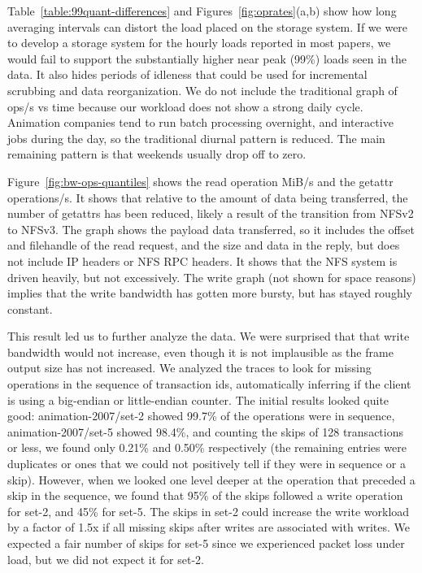 Table~\ref{table:99quant-differences} and
Figures~\ref{fig:oprates}(a,b) show how long averaging intervals can
distort the load placed on the storage system.  If we were to develop
a storage system for the hourly loads reported in most papers, we
would fail to support the substantially higher near peak (99\%) loads
seen in the data.  It also hides periods of idleness that could be
used for incremental scrubbing and data reorganization.  We do not
include the traditional graph of ops/s vs time because our workload
does not show a strong daily cycle.  Animation companies tend to run
batch processing overnight, and interactive jobs during the day, so
the traditional diurnal pattern is reduced.  The main remaining
pattern is that weekends usually drop off to zero.

Figure~\ref{fig:bw-ops-quantiles} shows the read operation MiB/s and
the getattr operations/s.  It shows that relative to the amount of
data being transferred, the number of getattrs has been reduced,
likely a result of the transition from NFSv2 to NFSv3.  The graph
shows the payload data transferred, so it includes the offset and
filehandle of the read request, and the size and data in the reply,
but does not include IP headers or NFS RPC headers.  It shows that the
NFS system is driven heavily, but not excessively. The write graph
(not shown for space reasons) implies that the write bandwidth has
gotten more bursty, but has stayed roughly constant.

This result led us to further analyze the data.  We were surprised
that that write bandwidth would not increase, even though it is not
implausible as the frame output size has not increased.  We analyzed
the traces to look for missing operations in the sequence of
transaction ids, automatically inferring if the client is using a
big-endian or little-endian counter.  The initial results looked quite
good: animation-2007/set-2 showed 99.7\% of the operations were in sequence,
animation-2007/set-5 showed 98.4\%, and counting the skips of 128 transactions
or less, we found only 0.21\% and 0.50\% respectively (the remaining
entries were duplicates or ones that we could not positively tell if
they were in sequence or a skip).  However, when we looked one level
deeper at the operation that preceded a skip in the sequence, we found
that 95\% of the skips followed a write operation for set-2, and 45\%
for set-5.  The skips in set-2 could increase the write workload by a
factor of 1.5x if all missing skips after writes are associated with
writes.  We expected a fair number of skips for set-5 since we
experienced packet loss under load, but we did not expect it for
set-2. 

